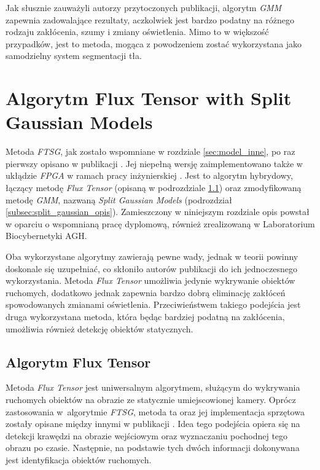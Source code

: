 Jak słusznie zauważyli autorzy przytoczonych publikacji, algorytm \textit{GMM} zapewnia zadowalające rezultaty, aczkolwiek jest bardzo podatny na różnego rodzaju zakłócenia, szumy i zmiany oświetlenia. 
Mimo to w większość przypadków, jest to metoda, mogąca z powodzeniem zostać wykorzystana jako samodzielny system segmentacji tła.  

\section{Algorytm Flux Tensor with Split Gaussian Models}
\label{sec:ftsg}

Metoda \textit{FTSG}, jak zostało wspomniane w rozdziale \ref{sec:model_inne}, po raz pierwszy opisano w publikacji \cite{wang_14}. 
Jej niepełną wersję zaimplementowano także w ukłądzie \textit{FPGA} w ramach pracy inżynierskiej \cite{janus_15}. 
Jest to algorytm hybrydowy, łączący metodę \textit{Flux Tensor} (opisaną w podrozdziale \ref{subsec:flux_tensor_opis}) oraz zmodyfikowaną metodę \textit{GMM}, nazwaną \textit{Split Gaussian Models} (podrozdział \ref{subsec:split_gaussian_opis}). 
Zamieszczony w niniejszym rozdziale opis powstał w oparciu o wspomnianą pracę dyplomową, również zrealizowaną w Laboratorium Biocybernetyki AGH.

Oba wykorzystane algorytmy zawierają pewne wady, jednak w teorii powinny doskonale się uzupełniać, co skłoniło autorów publikacji do ich jednoczesnego wykorzystania. Metoda \textit{Flux Tensor} umożliwia jedynie wykrywanie obiektów ruchomych, dodatkowo jednak zapewnia bardzo dobrą eliminację zakłóceń spowodowanych zmianami oświetlenia. Przeciwieństwem takiego podejścia jest druga wykorzystana metoda, która będąc bardziej podatną na zakłócenia, umożliwia również detekcję obiektów statycznych.

\subsection{Algorytm Flux Tensor}
\label{subsec:flux_tensor_opis}

Metoda \textit{Flux Tensor} jest uniwersalnym algorytmem, służącym do wykrywania ruchomych obiektów na obrazie ze statycznie umiejscowionej kamery. Oprócz zastosowania w~algorytmie \textit{FTSG}, metoda ta oraz jej implementacja sprzętowa zostały opisane między innymi w publikacji \cite{janus_16_flux}. 
Idea tego podejścia opiera się na detekcji krawędzi na obrazie wejściowym oraz wyznaczaniu pochodnej tego obrazu po czasie. 
Następnie, na podstawie tych dwóch informacji dokonywana jest identyfikacja obiektów ruchomych.

